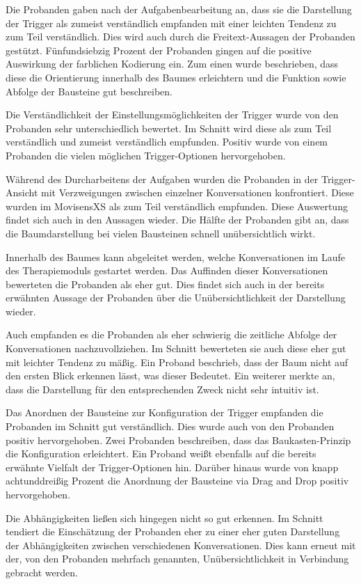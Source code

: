 Die Probanden gaben nach der Aufgabenbearbeitung an, dass sie die Darstellung der Trigger als zumeist verständlich empfanden mit einer leichten Tendenz zu zum Teil verständlich. Dies wird auch durch die Freitext-Aussagen der Probanden gestützt. Fünfundsiebzig Prozent der Probanden gingen auf die positive Auswirkung der farblichen Kodierung ein. Zum einen wurde beschrieben, dass diese die Orientierung innerhalb des Baumes erleichtern und die Funktion sowie Abfolge der Bausteine gut beschreiben.

Die Verständlichkeit der Einstellungsmöglichkeiten der Trigger wurde von den Probanden sehr unterschiedlich bewertet. Im Schnitt wird diese als zum Teil verständlich und zumeist verständlich empfunden. Positiv wurde von einem Probanden die vielen möglichen Trigger-Optionen hervorgehoben.

Während des Durcharbeitens der Aufgaben wurden die Probanden in der Trigger-Ansicht mit Verzweigungen zwischen einzelner Konversationen konfrontiert. Diese wurden im MovisensXS als zum Teil verständlich empfunden. Diese Auswertung findet sich auch in den Aussagen wieder. Die Hälfte der Probanden gibt an, dass die Baumdarstellung bei vielen Bausteinen schnell unübersichtlich wirkt. 

Innerhalb des Baumes kann abgeleitet werden, welche Konversationen im Laufe des Therapiemoduls gestartet werden. Das Auffinden dieser Konversationen bewerteten die Probanden als eher gut. Dies findet sich auch in der bereits erwähnten Aussage der Probanden über die Unübersichtlichkeit der Darstellung wieder. 

Auch empfanden es die Probanden als eher schwierig die zeitliche Abfolge der Konversationen nachzuvollziehen. Im Schnitt bewerteten sie auch diese eher gut mit leichter Tendenz zu mäßig. Ein Proband beschrieb, dass der Baum nicht auf den ersten Blick erkennen lässt, was dieser Bedeutet. Ein weiterer merkte an, dass die Darstellung für den entsprechenden Zweck nicht sehr intuitiv ist. 

Das Anordnen der Bausteine zur Konfiguration der Trigger empfanden die Probanden im Schnitt gut verständlich. Dies wurde auch von den Probanden positiv hervorgehoben. Zwei Probanden beschreiben, dass das Baukasten-Prinzip die Konfiguration erleichtert. Ein Proband weißt ebenfalls auf die bereits erwähnte Vielfalt der Trigger-Optionen hin. Darüber hinaus wurde von knapp achtunddreißig Prozent die Anordnung der Bausteine via Drag and Drop positiv hervorgehoben.

Die Abhängigkeiten ließen sich hingegen nicht so gut erkennen. Im Schnitt tendiert die Einschätzung der Probanden eher zu einer eher guten Darstellung der Abhängigkeiten zwischen verschiedenen Konversationen. Dies kann erneut mit der, von den Probanden mehrfach genannten, Unübersichtlichkeit in Verbindung gebracht werden. 

